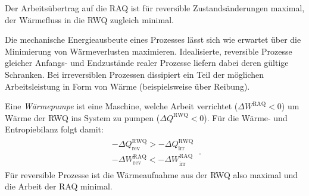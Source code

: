 \begin{formal}
     Der Arbeitsübertrag auf die RAQ ist für reversible Zustandsänderungen maximal, der Wärmefluss in die RWQ zugleich minimal. 
\end{formal}
Die mechanische Energieausbeute eines Prozesses lässt sich wie erwartet über die Minimierung von Wärmeverlusten maximieren. Idealisierte, reversible Prozesse gleicher Anfangs- und Endzustände realer Prozesse liefern dabei deren gültige Schranken. Bei irreversiblen Prozessen dissipiert ein Teil der möglichen Arbeitsleistung in Form von Wärme (beispielsweise über Reibung).

Eine \emph{Wärmepumpe} ist eine Maschine, welche Arbeit verrichtet ($\Delta W^\mathrm{RAQ}<0$) um Wärme der RWQ ins System zu pumpen ($\Delta Q^\mathrm{RWQ}<0$).
Für die Wärme- und Entropiebilanz folgt damit:
\begin{align*}
    \boxed{
    \begin{aligned}
            -\Delta Q^\mathrm{RWQ}_\mathrm{rev}>-\Delta Q^\mathrm{RWQ}_\mathrm{irr}\\
            -\Delta W^\mathrm{RAQ}_\mathrm{rev}<-\Delta W^\mathrm{RAQ}_\mathrm{irr}
    \end{aligned}
    }\:.
\end{align*}
Für reversible Prozesse ist die Wärmeaufnahme aus der RWQ also maximal und die Arbeit der RAQ minimal.












